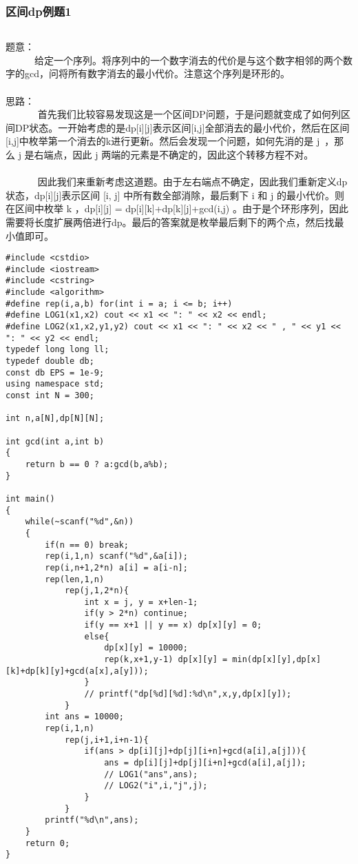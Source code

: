 \documentclass[twoside]{article}
\begin{document}
\subsubsection{区间dp例题1}
\begin{lstlisting}
\end{lstlisting}
题意：\\
       给定一个序列。将序列中的一个数字消去的代价是与这个数字相邻的两个数字的gcd，问将所有数字消去的最小代价。注意这个序列是环形的。\\
\\
思路：\\
        首先我们比较容易发现这是一个区间DP问题，于是问题就变成了如何列区间DP状态。一开始考虑的是dp[i][j]表示区间[i,j]全部消去的最小代价，然后在区间[i,j]中枚举第一个消去的k进行更新。然后会发现一个问题，如何先消的是 j ，那么 j 是右端点，因此 j 两端的元素是不确定的，因此这个转移方程不对。\\
\\
        因此我们来重新考虑这道题。由于左右端点不确定，因此我们重新定义dp状态，dp[i][j]表示区间 [i, j] 中所有数全部消除，最后剩下 i 和 j 的最小代价。则在区间中枚举 k ，dp[i][j] = dp[i][k]+dp[k][j]+gcd(i,j) 。由于是个环形序列，因此需要将长度扩展两倍进行dp。最后的答案就是枚举最后剩下的两个点，然后找最小值即可。\\
\begin{lstlisting}
#include <cstdio>
#include <iostream>
#include <cstring>
#include <algorithm>
#define rep(i,a,b) for(int i = a; i <= b; i++)
#define LOG1(x1,x2) cout << x1 << ": " << x2 << endl;
#define LOG2(x1,x2,y1,y2) cout << x1 << ": " << x2 << " , " << y1 << ": " << y2 << endl;
typedef long long ll;
typedef double db;
const db EPS = 1e-9;
using namespace std;
const int N = 300;
 
int n,a[N],dp[N][N];
 
int gcd(int a,int b)
{
	return b == 0 ? a:gcd(b,a%b);
}
 
int main()
{
	while(~scanf("%d",&n))
	{
		if(n == 0) break;
		rep(i,1,n) scanf("%d",&a[i]);
		rep(i,n+1,2*n) a[i] = a[i-n];
		rep(len,1,n)
			rep(j,1,2*n){
				int x = j, y = x+len-1;
				if(y > 2*n) continue;
				if(y == x+1 || y == x) dp[x][y] = 0;
				else{
					dp[x][y] = 10000;
					rep(k,x+1,y-1) dp[x][y] = min(dp[x][y],dp[x][k]+dp[k][y]+gcd(a[x],a[y]));
				}
				// printf("dp[%d][%d]:%d\n",x,y,dp[x][y]);
			}
		int ans = 10000;
		rep(i,1,n)
			rep(j,i+1,i+n-1){
				if(ans > dp[i][j]+dp[j][i+n]+gcd(a[i],a[j])){
					ans = dp[i][j]+dp[j][i+n]+gcd(a[i],a[j]);
					// LOG1("ans",ans);
					// LOG2("i",i,"j",j);
				}
			}
		printf("%d\n",ans);
	}
	return 0;
}\end{lstlisting}
\end{document}
